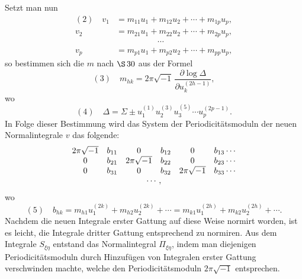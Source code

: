 \documentclass[10pt]{article}
\begin{document}
Setzt man nun
\[
\begin{aligned}
(2)\quad
v_1&=m_{11}u_1+m_{12}u_2+\cdots+m_{1p}u_p,\\
v_2&=m_{21}u_1+m_{22}u_2+\cdots+m_{2p}u_p,\\
&\hspace{5em}\cdots\\
v_p&=m_{p1}u_1+m_{p2}u_2+\cdots+m_{pp}u_p,
\end{aligned}
\]
so bestimmen sich die \(m\) nach \(\S\,30\) aus der Formel
\[
(3)\quad
m_{hk}=2\pi\sqrt{-1}\,\frac{\partial\log\Delta}{\partial u_k^{(2h-1)}},
\]
wo
\[
(4)\quad
\Delta=\Sigma\pm u_1^{(1)}u_2^{(3)}u_3^{(5)}\cdots u_p^{(2p-1)}.
\]
In Folge dieser Bestimmung wird das System der Periodicitätsmoduln der neuen Normalintegrale \(v\) das folgende:
\[
\begin{array}{cccccc}
2\pi\sqrt{-1}&b_{11}&0&b_{12}&0&b_{13}\cdots\\
0&b_{21}&2\pi\sqrt{-1}&b_{22}&0&b_{23}\cdots\\
0&b_{31}&0&b_{32}&2\pi\sqrt{-1}&b_{33}\cdots\\
\multicolumn{6}{c}{\cdots,}
\end{array}
\]
wo
\[
(5)\quad
b_{hk}=m_{h1}u_1^{(2k)}+m_{h2}u_2^{(2k)}+\cdots
=m_{k1}u_1^{(2h)}+m_{k2}u_2^{(2h)}+\cdots.
\]
Nachdem die neuen Integrale erster Gattung auf diese Weise normirt worden, ist es leicht, die Integrale dritter Gattung entsprechend zu normiren. Aus dem Integrale \(S_{\xi\eta}\) entstand das Normalintegral \(\Pi_{\xi\eta}\), indem man diejenigen Periodicitätsmoduln durch Hinzufügen von Integralen erster Gattung verschwinden machte, welche den Periodicitätsmoduln \(2\pi\sqrt{-1}\) entsprechen.

\end{document}
